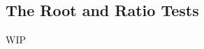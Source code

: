 \documentclass[../poma-notes.tex]{subfiles}
\begin{document}
\subsection*{The Root and Ratio Tests}

WIP
\end{document}
